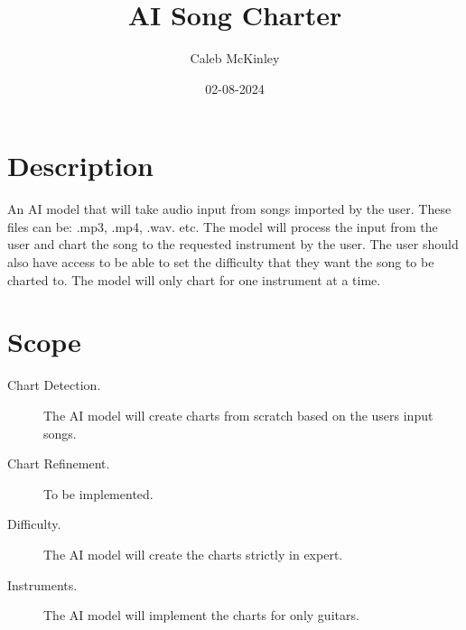 \documentclass{article}
\begin{document}
\title{AI Song Charter}
\author{Caleb McKinley}
\date{02-08-2024}

\maketitle

\section*{Description}
    An AI model that will take audio input from songs imported by the user. These files can be: .mp3, .mp4, .wav. etc.
    The model will process the input from the user and chart the song to the requested instrument by the user. The user
    should also have access to be able to set the difficulty that they want the song to be charted to. The model will only
    chart for one instrument at a time.

\section*{Scope}

\begin{description}
    \item[Chart Detection.] The AI model will create charts from scratch based on the users input songs.
    \item[Chart Refinement.] To be implemented.
    \item[Difficulty.] The AI model will create the charts strictly in expert.
    \item[Instruments.] The AI model will implement the charts for only guitars.

\end{description}
\end{document}
